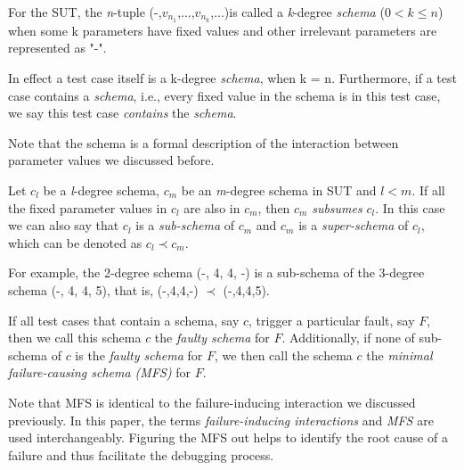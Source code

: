 \documentclass{sig-alternate}
\begin{document}
\begin{definition}
For the SUT, the \emph{n}-tuple (-,$v_{n_{1}}$,...,$v_{n_{k}}$,...)is called a \emph{k}-degree \emph{schema} ($0 < k \leq n $) when some k parameters have fixed values and other irrelevant parameters are represented as "-".

In effect a test case itself is a k-degree \emph{schema}, when k = n. Furthermore, if a test case contains a \emph{schema}, i.e., every fixed value in the schema is in this test case, we say this test case \emph{contains} the \emph{schema}.
\end{definition}

Note that the schema is a formal description of the interaction between parameter values we discussed before.

\begin{definition}
Let $c_{l}$ be a \emph{l}-degree schema, $c_{m}$ be an \emph{m}-degree schema in SUT and $l < m$. If all the fixed parameter values in $c_{l}$ are also in $c_{m}$, then $c_{m}$ \emph{subsumes} $c_{l}$. In this case we can also say that $c_{l}$ is a \emph{sub-schema} of $c_{m}$ and $c_{m}$ is a \emph{super-schema} of $c_{l}$, which can be denoted as $c_{l} \prec  c_{m}$.
\end{definition}

For example,  the 2-degree schema (-, 4, 4, -) is a sub-schema of the 3-degree schema (-, 4, 4, 5), that is, (-,4,4,-) $\prec$ (-,4,4,5).

\begin{definition}
If all test cases that contain a schema, say $c$, trigger a particular fault, say $F$, then we call this schema $c$ the \emph{faulty schema} for $F$. Additionally, if none of sub-schema of $c$ is the \emph{faulty schema} for $F$, we then call the schema $c$ the \emph{minimal failure-causing schema (MFS)} \cite{nie2011minimal} for $F$.

\end{definition}

Note that MFS is identical to the failure-inducing interaction we discussed previously. In this paper, the terms \emph{failure-inducing interactions} and \emph{MFS} are used interchangeably. Figuring the MFS out helps to identify the root cause of a failure and thus facilitate the debugging process.
\end{document}
